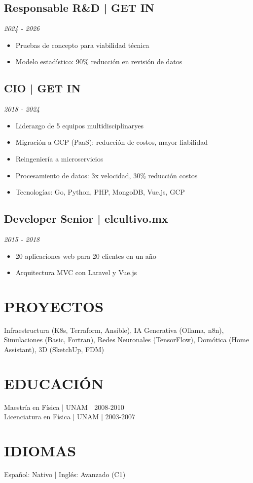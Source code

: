 \documentclass[10pt]{article}
\begin{document}
\subsection{Responsable R\&D | GET IN}
\textit{2024 - 2026}
\begin{itemize}
    \item Pruebas de concepto para viabilidad técnica
    \item Modelo estadístico: 90\% reducción en revisión de datos
\end{itemize}

\subsection{CIO | GET IN}
\textit{2018 - 2024}
\begin{itemize}
    \item Liderazgo de 5 equipos multidisciplinaryes
    \item Migración a GCP (PaaS): reducción de costos, mayor fiabilidad
    \item Reingeniería a microservicios
    \item Procesamiento de datos: 3x velocidad, 30\% reducción costos
    \item Tecnologías: Go, Python, PHP, MongoDB, Vue.js, GCP
\end{itemize}

\subsection{Developer Senior | elcultivo.mx}
\textit{2015 - 2018}
\begin{itemize}
    \item 20 aplicaciones web para 20 clientes en un año
    \item Arquitectura MVC con Laravel y Vue.js
\end{itemize}

\section{PROYECTOS}
Infraestructura (K8s, Terraform, Ansible), IA Generativa (Ollama, n8n), Simulaciones (Basic, Fortran), Redes Neuronales (TensorFlow), Domótica (Home Assistant), 3D (SketchUp, FDM)

\section{EDUCACIÓN}
Maestría en Física | UNAM | 2008-2010\\
Licenciatura en Física | UNAM | 2003-2007

\section{IDIOMAS}
Español: Nativo | Inglés: Avanzado (C1)
\end{document}
